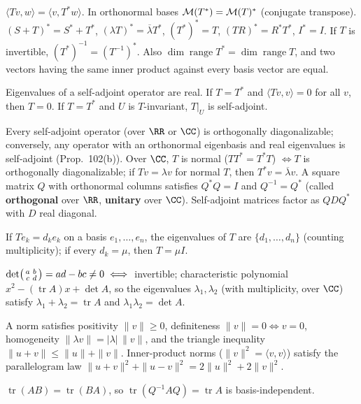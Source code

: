 \documentclass[10pt]{scrartcl}
\DeclareMathOperator{\tr}{tr}\DeclareMathOperator{\nul}{null}\DeclareMathOperator{\range}{range}\DeclareMathOperator{\spn}{span}
\begin{document}
\begin{enumerate}[label=(T\arabic*),leftmargin=2.6em,itemsep=8pt]
  \ii {} $\langle Tv,w\rangle=\langle v,T^*w\rangle$. In orthonormal bases $\mathcal M(T^*)=\mathcal M(T)^*$ (conjugate transpose). $(S+T)^*=S^*+T^*$, $(\lambda T)^*=\overline{\lambda}T^*$, $(T^*)^*=T$, $(TR)^*=R^*T^*$, $I^*=I$. If $T$ is invertible, $(T^*)^{-1}=(T^{-1})^*$. Also $\dim\range T^*=\dim\range T$, and two vectors having the same inner product against every basis vector are equal.

  \ii {} Eigenvalues of a self-adjoint operator are real. If $T=T^*$ and $\langle Tv,v\rangle=0$ for all $v$, then $T=0$. If $T=T^*$ and $U$ is $T$-invariant, $T|_U$ is self-adjoint.

  \ii {} Every self-adjoint operator (over $\RR$ or $\CC$) is orthogonally diagonalizable; conversely, any operator with an orthonormal eigenbasis and real eigenvalues is self-adjoint (Prop.~102(b)). Over $\CC$, $T$ is normal ($TT^*=T^*T$) $\iff T$ is orthogonally diagonalizable; if $Tv=\lambda v$ for normal $T$, then $T^*v=\overline{\lambda}v$. A square matrix $Q$ with orthonormal columns satisfies $Q^*Q=I$ and $Q^{-1}=Q^*$ (called \textbf{orthogonal} over $\RR$, \textbf{unitary} over $\CC$). Self-adjoint matrices factor as $QDQ^*$ with $D$ real diagonal.

  \ii {} If $Te_k=d_k e_k$ on a basis $e_1,\dots,e_n$, the eigenvalues of $T$ are $\{d_1,\dots,d_n\}$ (counting multiplicity); if every $d_k=\mu$, then $T=\mu I$.

  \ii {} $\det\begin{psmallmatrix}a&b\\c&d\end{psmallmatrix}=ad-bc\neq0\iff$ invertible; characteristic polynomial $x^2-(\tr A)x+\det A$, so the eigenvalues $\lambda_1,\lambda_2$ (with multiplicity, over $\CC$) satisfy $\lambda_1+\lambda_2=\tr A$ and $\lambda_1\lambda_2=\det A$.

  \ii {} A norm satisfies positivity $\|v\|\ge0$, definiteness $\|v\|=0\iff v=0$, homogeneity $\|\lambda v\|=|\lambda|\,\|v\|$, and the triangle inequality $\|u+v\|\le\|u\|+\|v\|$. Inner-product norms ($\|v\|^2=\langle v,v\rangle$) satisfy the parallelogram law $\|u+v\|^2+\|u-v\|^2=2\|u\|^2+2\|v\|^2$.

  \ii {} $\tr(AB)=\tr(BA)$, so $\tr(Q^{-1}AQ)=\tr A$ is basis-independent.
\end{enumerate}
\end{document}
